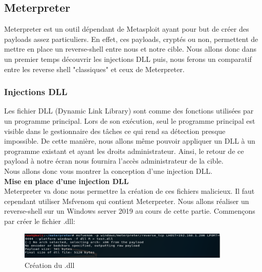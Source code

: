 \subsection{Meterpreter}

Meterpreter est un outil dépendant de Metasploit ayant pour but de créer des payloads assez particuliers. En effet, ces payloads, cryptés ou non, permettent de mettre en place un reverse-shell entre nous et notre cible. Nous allons donc dans un premier temps découvrir les injections DLL puis, nous ferons un comparatif entre les reverse shell "classiques" et ceux de Meterpreter.


\subsubsection{Injections DLL}

Les fichier DLL (Dynamic Link Library) sont comme des fonctions utilisées par un programme principal. Lors de son exécution, seul le programme principal est visible dans le gestionnaire des tâches ce qui rend sa détection presque impossible. De cette manière, nous allons même pouvoir appliquer un DLL à un programme existant et ayant les droits administrateur. Ainsi, le retour de ce payload à notre écran nous fournira l'accès administrateur de la cible.\\
Nous allons donc vous montrer la conception d'une injection DLL.\\

 \textbf{Mise en place d'une injection DLL}\\

Meterpreter va donc nous permettre la création de ces fichiers malicieux. Il faut cependant utiliser Msfvenom qui contient Meterpreter. Nous allons réaliser un reverse-shell sur un Windows server 2019 au cours de cette partie. Commençons par créer le fichier .dll:

\begin{figure}[htp!]
  \centering
  \setlength\figureheight{7cm}
  \setlength\figurewidth{9cm}
  \includegraphics[width=0.9\textwidth]{oui/Ancien/imangeancien/meterpreter/msfvenom.PNG}
  \caption{Création du .dll}
  \label{fig:courbe-tikz}
\end{figure}

